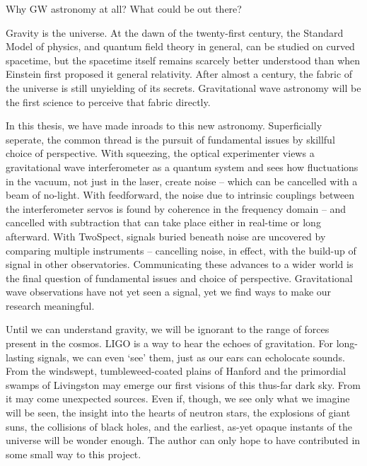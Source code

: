         Why GW astronomy at all? What could be out there?

        Gravity is the universe. At the dawn of the twenty-first century, the Standard Model of physics, and quantum field theory in general, can be studied on curved spacetime, but the spacetime itself remains scarcely better understood than when Einstein first proposed it general relativity. 
After almost a century, the fabric of the universe is still unyielding of its secrets. 
Gravitational wave astronomy will be the first science to perceive that fabric directly. 

        In this thesis, we have made inroads to this new astronomy. Superficially seperate, the common thread is the pursuit of fundamental issues by skillful choice of perspective. 
With squeezing, the optical experimenter views a gravitational wave interferometer as a quantum system and sees how fluctuations in the vacuum, not just in the laser, create noise -- which can be cancelled with a beam of no-light.
With feedforward, the noise due to intrinsic couplings between the interferometer servos is found by coherence in the frequency domain -- and cancelled with subtraction that can take place either in real-time or long afterward.
With TwoSpect, signals buried beneath noise are uncovered by comparing multiple instruments -- cancelling noise, in effect, with the build-up of signal in other observatories.
Communicating these advances to a wider world is the final question of fundamental issues and choice of perspective.
Gravitational wave observations have not yet seen a signal, yet we find ways to make our research meaningful.

Until we can understand gravity, we will be ignorant to the range of forces present in the cosmos.
LIGO is a way to hear the echoes of gravitation.
For long-lasting signals, we can even `see' them, just as our ears can echolocate sounds.
 From the windswept, tumbleweed-coated plains of Hanford and the primordial swamps of Livingston may emerge our first visions of this thus-far dark sky. From it may come unexpected sources. Even if, though, we see only what we imagine will be seen, the insight into the hearts of neutron stars, the explosions of giant suns, the collisions of black holes, and the earliest, as-yet opaque instants of the universe will be wonder enough. The author can only hope to have contributed in some small way to this project. 

  

